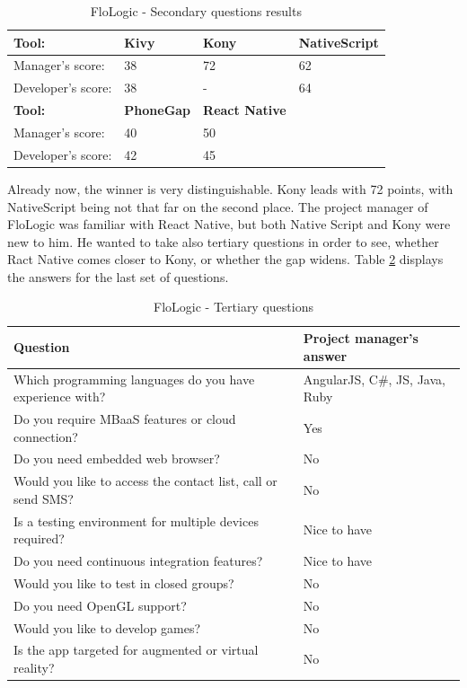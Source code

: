 \documentclass[english,master,public,dept460,male,cpdeclaration,oneside]{diploma}
\begin{document}
\begin{table}[!h]
	\centering
	\caption{FloLogic - Secondary questions results}	
	\label{table:flologicResults2}
	\begin{tabular}{p{4cm} | p{3cm} | p{3cm} | p{3cm}}
		\toprule		
		\textbf{Tool:} & \textbf{Kivy} & \textbf{Kony} & \textbf{NativeScript} \\
		\midrule
		Manager’s score: & 38 & 72 & 62 \\
		Developer’s score: & 38 & - & 64 \\ 
		\midrule
		\textbf{Tool:} & \textbf{PhoneGap} & \textbf{React Native} & \\
		\midrule
		Manager’s score: & 40 & 50 & \\
		Developer’s score: & 42 & 45 & \\			
		\midrule
	\end{tabular}
\end{table}

Already now, the winner is very distinguishable. Kony leads with 72 points, with NativeScript being not that far on the second place. The project manager of FloLogic was familiar with React Native, but both Native Script and Kony were new to him. He wanted to take also tertiary questions in order to see, whether Ract Native comes closer to Kony, or whether the gap widens. Table \ref{table:flologicTertiary} displays the answers for the last set of questions.

\begin{table}[!h]
	\centering
	\caption{FloLogic - Tertiary questions}
	\label{table:flologicTertiary}
	\begin{tabular}{p{9.5cm} | p{3cm}}
		\toprule		
		\textbf{Question} &	\textbf{Project manager’s answer} \\
		\midrule		
		Which programming languages do you have experience with? & AngularJS, C\#, JS, Java, Ruby \\
		Do you require MBaaS features or cloud connection? & Yes \\
		Do you need embedded web browser? & No \\
		Would you like to access the contact list, call or send SMS? & No \\
		Is a testing environment for multiple devices required? & Nice to have \\
		Do you need continuous integration features? & Nice to have \\
		Would you like to test in closed groups? & No \\
		Do you need OpenGL support? & No \\
		Would you like to develop games? & No \\
		Is the app targeted for augmented or virtual reality? & No \\			
		\midrule
	\end{tabular}
\end{table}
\end{document}
